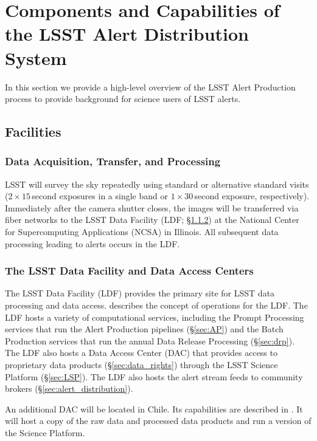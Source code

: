 \section{Components and Capabilities of the LSST Alert Distribution System}\label{sec:components}

In this section we provide a high-level overview of the LSST Alert Production process to provide background for science users of LSST alerts.

\subsection{Facilities}

\subsubsection{Data Acquisition, Transfer, and Processing}

LSST will survey the sky repeatedly using standard or alternative standard visits ($2\times15$\,second exposures in a single band or $1\times30$\,second exposure, respectively).  
Immediately after the camera shutter closes, the images will be transferred via fiber networks to the LSST Data Facility (LDF; \S \ref{sec:LDF}) at the National Center for Supercomputing Applications (NCSA) in Illinois.
All subsequent data processing leading to alerts occurs in the LDF.

\subsubsection{The LSST Data Facility and Data Access Centers} \label{sec:LDF}

The LSST Data Facility (LDF) provides the primary site for LSST data processing and data access.
 describes the concept of operations for the LDF.
The LDF hosts a variety of computational services, including the Prompt Processing services that run the Alert Production pipelines (\S \ref{sec:AP}) and the Batch Production services that run the annual Data Release Processing (\S \ref{sec:drp}). 
The LDF also hosts a Data Access Center (DAC) that provides access to proprietary data products (\S \ref{sec:data_rights}) through the LSST Science Platform (\S \ref{sec:LSP}).
The LDF also hosts the alert stream feeds to community brokers (\S \ref{sec:alert_distribution}).

An additional DAC will be located in Chile.  
Its capabilities are described in .
It will host a copy of the raw data and processed data products and run a version of the Science Platform.

